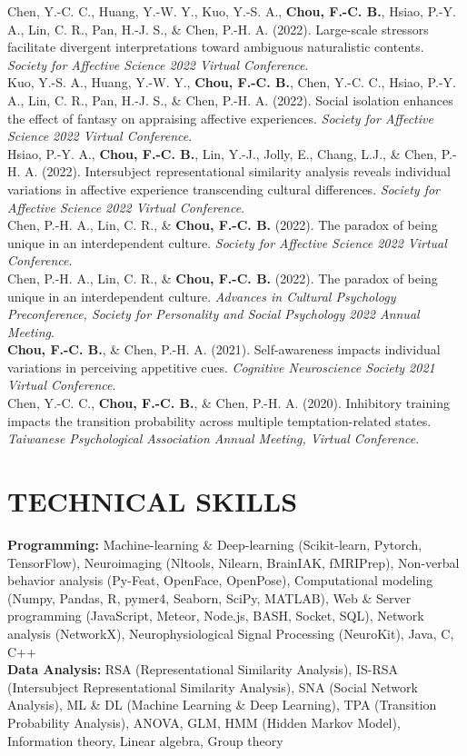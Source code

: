 \documentclass[a4paper,12pt]{article}
\newcommand{\sectionspace}{0pt} %
\newcommand{\itemspace}{7pt} %
\begin{document}
\noindent Chen, Y.-C. C., Huang, Y.-W. Y., Kuo, Y.-S. A., \textbf{Chou, F.-C. B.}, Hsiao, P.-Y. A., Lin, C. R., Pan, H.-J. S., \& Chen, P.-H. A. (2022). Large-scale stressors facilitate divergent interpretations toward ambiguous naturalistic contents. \textit{Society for Affective Science 2022 Virtual Conference}.\\[\itemspace]
\noindent Kuo, Y.-S. A., Huang, Y.-W. Y., \textbf{Chou, F.-C. B.}, Chen, Y.-C. C., Hsiao, P.-Y. A., Lin, C. R., Pan, H.-J. S., \& Chen, P.-H. A. (2022). Social isolation enhances the effect of fantasy on appraising affective experiences. \textit{Society for Affective Science 2022 Virtual Conference}.\\[\itemspace]
\noindent Hsiao, P.-Y. A., \textbf{Chou, F.-C. B.}, Lin, Y.-J., Jolly, E., Chang, L.J., \& Chen, P.-H. A. (2022). Intersubject representational similarity analysis reveals individual variations in affective experience transcending cultural differences. \textit{Society for Affective Science 2022 Virtual Conference}.\\[\itemspace]
\noindent Chen, P.-H. A., Lin, C. R., \& \textbf{Chou, F.-C. B.} (2022). The paradox of being unique in an interdependent culture. \textit{Society for Affective Science 2022 Virtual Conference}.\\[\itemspace]
\noindent Chen, P.-H. A., Lin, C. R., \& \textbf{Chou, F.-C. B.} (2022). The paradox of being unique in an interdependent culture. \textit{Advances in Cultural Psychology Preconference, Society for Personality and Social Psychology 2022 Annual Meeting}.\\[\itemspace]
\noindent \textbf{Chou, F.-C. B.}, \& Chen, P.-H. A. (2021). Self-awareness impacts individual variations in perceiving appetitive cues. \textit{Cognitive Neuroscience Society 2021 Virtual Conference}.\\[\itemspace]
\noindent Chen, Y.-C. C., \textbf{Chou, F.-C. B.}, \& Chen, P.-H. A. (2020). Inhibitory training impacts the transition probability across multiple temptation-related states. \textit{Taiwanese Psychological Association Annual Meeting, Virtual Conference}.\\[\itemspace]

\vspace{\sectionspace}

\section*{TECHNICAL SKILLS}
\textbf{Programming:} Machine-learning \& Deep-learning (Scikit-learn, Pytorch, TensorFlow), Neuroimaging (Nltools, Nilearn, BrainIAK, fMRIPrep), Non-verbal behavior analysis (Py-Feat, OpenFace, OpenPose), Computational modeling (Numpy, Pandas, R, pymer4, Seaborn, SciPy, MATLAB), Web \& Server programming (JavaScript, Meteor, Node.js, BASH, Socket, SQL), Network analysis (NetworkX), Neurophysiological Signal Processing (NeuroKit), Java, C, C++ \\[\itemspace]
\noindent\textbf{Data Analysis:} RSA (Representational Similarity Analysis), IS-RSA (Intersubject Representational Similarity Analysis), SNA (Social Network Analysis), ML \& DL (Machine Learning \& Deep Learning), TPA (Transition Probability Analysis), ANOVA, GLM, HMM (Hidden Markov Model), Information theory, Linear algebra, Group theory
\end{document}
